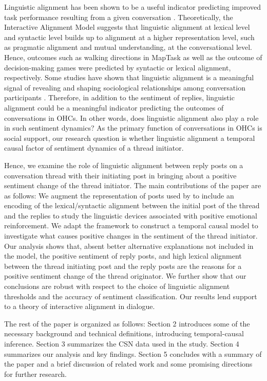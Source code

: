 \documentclass[man,biblatex,floatsintext]{apa6}
\begin{document}
Linguistic alignment has been shown to be a useful indicator predicting improved task performance resulting from a given conversation \parencite{reitter2007predicting}. Theoretically, the Interactive Alignment Model \parencite{pickering2004toward} suggests that linguistic alignment at lexical level and syntactic level builds up to alignment at a higher representation level, such as pragmatic alignment and mutual understanding, at the conversational level. Hence, outcomes such as walking directions in MapTask \parencite{reitter_alignment_2014} as well as the outcome of decision-making games \parencite{fusaroli2012coming} were predicted by syntactic or lexical alignment, respectively. Some studies have shown that linguistic alignment is a meaningful signal of revealing and shaping sociological relationships among conversation participants \parencite{jones2014finding}. Therefore, in addition to the sentiment of replies, linguistic alignment could be a meaningful indicator predicting the outcomes of conversations in OHCs. In other words, does linguistic alignment also play a role in such sentiment dynamics? As the primary function of conversations in OHCs is social support, our research question is whether linguistic alignment a temporal causal factor of sentiment dynamics of a thread initiator. 

Hence, we examine the role of linguistic alignment between reply posts on a conversation thread with their initiating post in bringing about a positive sentiment change of the thread initiator. The main contributions of the paper are as follows: We augment the representation of posts used by \textcite{bui2016temporal} to include an encoding of the lexical/syntactic alignment between the initial post of the thread and the replies to study the linguistic devices associated with positive emotional reinforcement. We adapt the framework to construct a temporal causal model to investigate what causes positive changes in the sentiment of the thread initiator. Our analysis shows that, absent better alternative explanations not included in the model, the positive sentiment  of  reply posts,  and  high lexical alignment between the thread initiating post and the reply posts are the reasons for a positive sentiment change of the thread originator. We further show that our conclusions are robust with respect to the choice of linguistic alignment thresholds and the accuracy of sentiment classification. Our results lend support to a theory of interactive alignment in dialogue.

The rest of the paper is organized as follows: Section 2 introduces some of the necessary background and technical definitions, introducing temporal-causal inference. Section 3 summarizes the CSN data used in the study. Section 4 summarizes our analysis and key findings.  Section 5 concludes with a summary of the paper and a brief discussion of related work and some promising directions for further research. 
\end{document}
